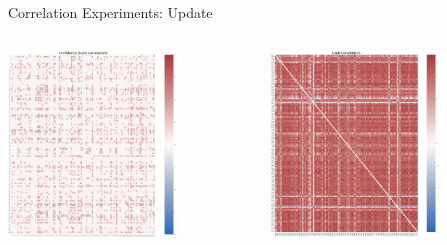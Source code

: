 \begin{frame}{Correlation Experiments: Update}
    \begin{columns}
        \begin{column}{0.5\textwidth}
            \centering
            \includegraphics[height=0.7\textheight,width=0.7\textwidth,keepaspectratio]{images/conf_corrs_heatmap.png}
        \end{column}
        \begin{column}{0.5\textwidth}
            \centering
            \includegraphics[height=0.7\textheight,width=0.7\textwidth,keepaspectratio]{images/logit_corrs_heatmap.png}
        \end{column}
    \end{columns}
\end{frame}

